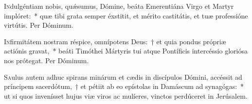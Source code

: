 \documentclass[vesperale_romanum.tex]{subfiles}
\begin{document}

\oratio

\lettrine{I}{n}dulgéntiam nobis, quǽsumus, Dómine, beáta Emerentiána Virgo et Martyr implóret:~* quæ tibi grata semper éxstitit, et mérito castitátis, et tuæ professióne virtútis. Per Dóminum.

\vespsequentiscomm

\myrule


\duplex

\oratio

\lettrine{I}{n}firmitátem nostram réspice, omnípotens Deus:~† et quia pondus própriæ actiónis gravat,~* beáti Timóthei Mártyris tui atque Pontíficis intercéssio gloriósa nos prótegat.
Per Dóminum.



\myrule
\newpage
{}
\label{25_jan}
\duplexmajus


\label{109_8G_jan}










\lettrine{S}{a}ulus autem adhuc spirans minárum et cædis in discípulos Dómini, accéssit ad príncipem sacerdótum,~† et pétiit ab eo epístolas in Damáscum ad synagógas:~* ut si quos invenísset hujus viæ viros ac mulíeres, vinctos perdúceret in Jerúsalem.
\end{document}
